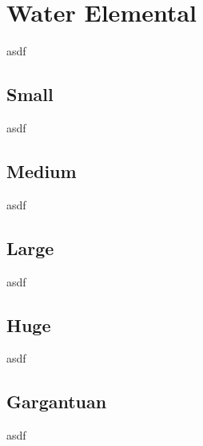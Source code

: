 \section{Water Elemental}

asdf

\subsection{Small}

asdf

\subsection{Medium}

asdf

\subsection{Large}

asdf

\subsection{Huge}

asdf

\subsection{Gargantuan}

asdf